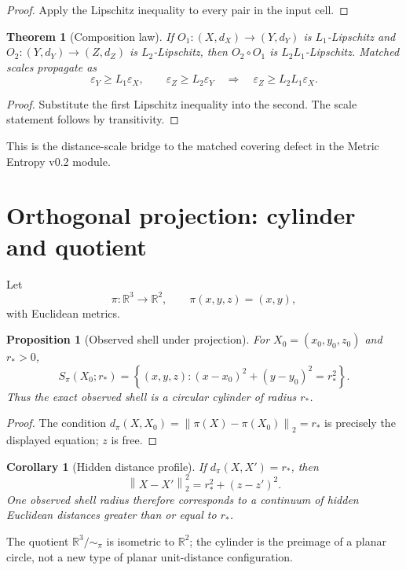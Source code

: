 \documentclass[11pt,a4paper]{article}
\theoremstyle{definition}
\theoremstyle{plain}
\newtheorem{theorem}[definition]{Theorem}
\newtheorem{proposition}[definition]{Proposition}
\newtheorem{corollary}[definition]{Corollary}
\theoremstyle{remark}
\newcommand{\R}{\mathbb{R}}
\newcommand{\norm}[1]{\left\lVert #1\right\rVert}
\newcommand{\set}[1]{\left\{#1\right\}}
\begin{document}
\begin{proof}
Apply the Lipschitz inequality to every pair in the input cell.
\end{proof}

\begin{theorem}[Composition law]
\label{thm:composition}
If $O_1:(X,d_X)\to(Y,d_Y)$ is $L_1$-Lipschitz and
$O_2:(Y,d_Y)\to(Z,d_Z)$ is $L_2$-Lipschitz, then
$O_2\circ O_1$ is $L_2L_1$-Lipschitz. Matched scales propagate as
\[
 \varepsilon_Y\geq L_1\varepsilon_X,\qquad
 \varepsilon_Z\geq L_2\varepsilon_Y
 \quad\Longrightarrow\quad
 \varepsilon_Z\geq L_2L_1\varepsilon_X.
\]
\end{theorem}

\begin{proof}
Substitute the first Lipschitz inequality into the second. The scale
statement follows by transitivity.
\end{proof}

This is the distance-scale bridge to the matched covering defect in the
Metric Entropy v0.2 module.

\section{Orthogonal projection: cylinder and quotient}

Let
\[
 \pi:\R^3\to\R^2,\qquad \pi(x,y,z)=(x,y),
\]
with Euclidean metrics.

\begin{proposition}[Observed shell under projection]
For $X_0=(x_0,y_0,z_0)$ and $r_*>0$,
\[
 S_\pi(X_0;r_*)
 =
 \set{(x,y,z):(x-x_0)^2+(y-y_0)^2=r_*^2}.
\]
Thus the exact observed shell is a circular cylinder of radius $r_*$.
\end{proposition}

\begin{proof}
The condition
$d_\pi(X,X_0)=\norm{\pi(X)-\pi(X_0)}_2=r_*$ is precisely the displayed
equation; $z$ is free.
\end{proof}

\begin{corollary}[Hidden distance profile]
If $d_\pi(X,X')=r_*$, then
\[
 \norm{X-X'}_2^2
 =
 r_*^2+(z-z')^2.
\]
One observed shell radius therefore corresponds to a continuum of hidden
Euclidean distances greater than or equal to $r_*$.
\end{corollary}

The quotient $\R^3/{\sim_\pi}$ is isometric to $\R^2$; the cylinder is the
preimage of a planar circle, not a new type of planar unit-distance
configuration.
\end{document}
